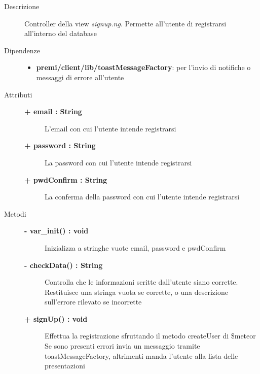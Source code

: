\begin{description}
\item[Descrizione] \hfill
	Controller della view \textit{signup.ng}. Permette all'utente di registrarsi all'interno del database
	
	
	
\item[Dipendenze] \hfill
	\begin{itemize}
		\item \textbf{premi/client/lib/toastMessageFactory}: per l'invio di notifiche o messaggi di errore all'utente
	\end{itemize}
	
	
\item[Attributi] \hfill
	\begin{description}
		\item[\textbf{+ email : String			}] \hfill
			L'email con cui l'utente intende registrarsi
		\item[\textbf{+ password : String			}] \hfill
			La password con cui l'utente intende registrarsi
		\item[\textbf{+ pwdConfirm : String			}] \hfill
			La conferma della password con cui l'utente intende registrarsi
	\end{description}
	
	
\item[Metodi] \hfill

	\begin{description}
		\item[\textbf{\color{blue}- var\_init() : void			}] \hfill
			Inizializza a stringhe vuote email, password e pwdConfirm
	\end{description}
	
	\begin{description}
		\item[\textbf{\color{blue}- checkData() : String			}] \hfill
			Controlla che le informazioni scritte dall'utente siano corrette. Restituisce una stringa vuota se corrette, o una descrizione sull'errore rilevato se incorrette
	\end{description}
	
	\begin{description}
		\item[\textbf{\color{blue}+ signUp() : void			}] \hfill
			Effettua la registrazione sfruttando il metodo createUser di \$meteor
			Se sono presenti errori invia un messaggio tramite toastMessageFactory, altrimenti manda l'utente alla lista delle presentazioni
	\end{description}

\end{description}
















